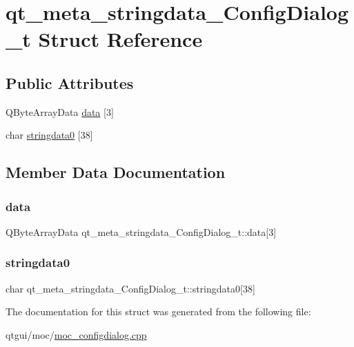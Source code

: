 \hypertarget{structqt__meta__stringdata___config_dialog__t}{}\section{qt\+\_\+meta\+\_\+stringdata\+\_\+\+Config\+Dialog\+\_\+t Struct Reference}
\label{structqt__meta__stringdata___config_dialog__t}
\subsection*{Public Attributes}
\begin{DoxyCompactItemize}
\item 
Q\+Byte\+Array\+Data \mbox{\hyperlink{structqt__meta__stringdata___config_dialog__t_a9fa8898b1b10909f5df45fa6da22654c}{data}} \mbox{[}3\mbox{]}
\item 
char \mbox{\hyperlink{structqt__meta__stringdata___config_dialog__t_ad97e5f59786bc704c886aa07b444ad59}{stringdata0}} \mbox{[}38\mbox{]}
\end{DoxyCompactItemize}


\subsection{Member Data Documentation}
\mbox{\label{structqt__meta__stringdata___config_dialog__t_a9fa8898b1b10909f5df45fa6da22654c}} 
\subsubsection{\texorpdfstring{data}{data}}
{\footnotesize\ttfamily Q\+Byte\+Array\+Data qt\+\_\+meta\+\_\+stringdata\+\_\+\+Config\+Dialog\+\_\+t\+::data\mbox{[}3\mbox{]}}

\mbox{\label{structqt__meta__stringdata___config_dialog__t_ad97e5f59786bc704c886aa07b444ad59}} 
\subsubsection{\texorpdfstring{stringdata0}{stringdata0}}
{\footnotesize\ttfamily char qt\+\_\+meta\+\_\+stringdata\+\_\+\+Config\+Dialog\+\_\+t\+::stringdata0\mbox{[}38\mbox{]}}



The documentation for this struct was generated from the following file\+:\begin{DoxyCompactItemize}
\item 
qtgui/moc/\mbox{\hyperlink{moc__configdialog_8cpp}{moc\+\_\+configdialog.\+cpp}}\end{DoxyCompactItemize}
